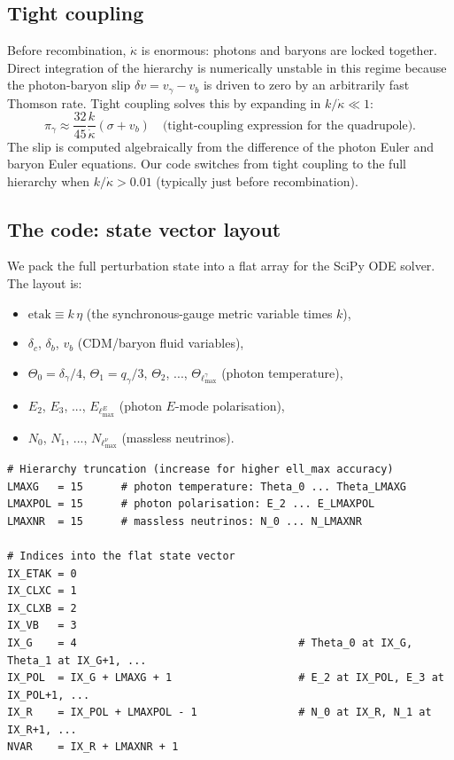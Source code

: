 \subsection{Tight coupling}

Before recombination, $\dot\kappa$ is enormous: photons and baryons are locked together. Direct integration of the hierarchy is numerically unstable in this regime because the photon-baryon slip $\delta v = v_\gamma - v_b$ is driven to zero by an arbitrarily fast Thomson rate. Tight coupling solves this by expanding in $k/\dot\kappa \ll 1$:
\[
  \pi_\gamma \approx \frac{32}{45}\frac{k}{\dot\kappa}(\sigma + v_b) \quad\text{(tight-coupling expression for the quadrupole)}.
\]
The slip is computed algebraically from the difference of the photon Euler and baryon Euler equations. Our code switches from tight coupling to the full hierarchy when $k/\dot\kappa > 0.01$ (typically just before recombination).

\subsection{The code: state vector layout}

We pack the full perturbation state into a flat array for the SciPy ODE solver. The layout is:
\begin{itemize}
  \item $\mathrm{etak} \equiv k\,\eta$ (the synchronous-gauge metric variable times $k$),
  \item $\delta_c$, $\delta_b$, $v_b$ (CDM/baryon fluid variables),
  \item $\Theta_0 = \delta_\gamma/4$, $\Theta_1 = q_\gamma/3$, $\Theta_2$, ..., $\Theta_{\ell_\mathrm{max}^\gamma}$ (photon temperature),
  \item $E_2$, $E_3$, ..., $E_{\ell_\mathrm{max}^E}$ (photon $E$-mode polarisation),
  \item $N_0$, $N_1$, ..., $N_{\ell_\mathrm{max}^\nu}$ (massless neutrinos).
\end{itemize}

\begin{codebox}
\begin{lstlisting}[style=python]
# Hierarchy truncation (increase for higher ell_max accuracy)
LMAXG   = 15      # photon temperature: Theta_0 ... Theta_LMAXG
LMAXPOL = 15      # photon polarisation: E_2 ... E_LMAXPOL
LMAXNR  = 15      # massless neutrinos: N_0 ... N_LMAXNR

# Indices into the flat state vector
IX_ETAK = 0
IX_CLXC = 1
IX_CLXB = 2
IX_VB   = 3
IX_G    = 4                                   # Theta_0 at IX_G, Theta_1 at IX_G+1, ...
IX_POL  = IX_G + LMAXG + 1                    # E_2 at IX_POL, E_3 at IX_POL+1, ...
IX_R    = IX_POL + LMAXPOL - 1                # N_0 at IX_R, N_1 at IX_R+1, ...
NVAR    = IX_R + LMAXNR + 1
\end{lstlisting}
\end{codebox}

